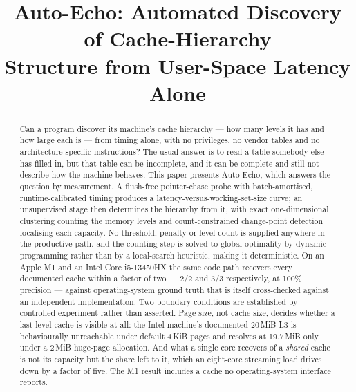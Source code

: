 \documentclass[conference]{IEEEtran}
\begin{document}
\title{Auto-Echo: Automated Discovery of Cache-Hierarchy\\
Structure from User-Space Latency Alone}

\author{
}

\maketitle

\begin{abstract}
Can a program discover its machine's cache hierarchy --- how many levels it has
and how large each is --- from timing alone, with no privileges, no vendor tables
and no architecture-specific instructions? The usual answer is to read a table
somebody else has filled in, but that table can be incomplete, and it can be
complete and still not describe how the machine behaves. This paper presents
Auto-Echo, which answers the question by measurement. A flush-free pointer-chase
probe with batch-amortised, runtime-calibrated timing produces a
latency-versus-working-set-size curve; an unsupervised stage then determines the
hierarchy from it, with exact one-dimensional clustering counting the memory
levels and count-constrained change-point detection localising each capacity. No
threshold, penalty or level count is supplied anywhere in the productive path,
and the counting step is solved to global optimality by dynamic programming
rather than by a local-search heuristic, making it deterministic. On an Apple M1
and an Intel Core i5-13450HX the same code path recovers every documented cache
within a factor of two --- 2/2 and 3/3 respectively, at 100\% precision ---
against operating-system ground truth that is itself cross-checked against an
independent implementation. Two boundary conditions are established by controlled
experiment rather than asserted. Page size, not cache size, decides whether a
last-level cache is visible at all: the Intel machine's documented 20\,MiB L3 is
behaviourally unreachable under default 4\,KiB pages and resolves at 19.7\,MiB
only under a 2\,MiB huge-page allocation. And what a single core recovers of a
\emph{shared} cache is not its capacity but the share left to it, which an
eight-core streaming load drives down by a factor of five. The M1 result includes
a cache no operating-system interface reports.
\end{abstract}
\end{document}
